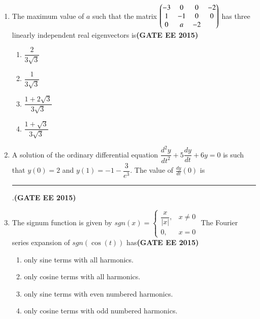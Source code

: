 \documentclass[a4paper,12pt]{exam}
\theoremstyle{remark}
\begin{document}
\begin{enumerate}
\begin{multicols}{4}
    \begin{enumerate}
        \item $\dfrac{G_1}{1 + G_2(1 + G_1)}$
        \item $\dfrac{G_2}{1 + G_1(1 + G_2)}$
        \item $\dfrac{G_1}{1 + G_1G_2}$
        \item $\dfrac{G_2}{1 + G_1G_2}$
    \end{enumerate}
\end{multicols}
\item The maximum value of $a$ such that the matrix
$
\begin{pmatrix}
-3 & 0 & 0 & -2 \\
1 & -1 & 0 & 0 \\
0 & a & -2
\end{pmatrix}
$
has three linearly independent real eigenvectors is\hfill{\textbf{(GATE EE 2015)}}
\begin{multicols}{4}
    \begin{enumerate}
        \item $\dfrac{2}{3\sqrt{3}}$
        \item $\dfrac{1}{3\sqrt{3}}$
        \item $\dfrac{1+2\sqrt{3}}{3\sqrt{3}}$
        \item $\dfrac{1+\sqrt{3}}{3\sqrt{3}}$
    \end{enumerate}
\end{multicols}
\item A solution of the ordinary differential equation $\dfrac{d^2y}{dt^2} + 5\dfrac{dy}{dt} + 6y = 0$ is such that $y(0) = 2$ and $y(1) = -1 - \dfrac{3}{e^3}$. The value of $\frac{dy}{dt}(0)$ is \rule{3cm}{0.15mm}.\hfill{\textbf{(GATE EE 2015)}}
\item The signum function is given by
$
sgn(x) =
\begin{cases}
\dfrac{x}{|x|}, & x \neq 0 \\
0, & x = 0
\end{cases}
$
The Fourier series expansion of $sgn(\cos(t))$ has\hfill{\textbf{(GATE EE 2015)}}
    \begin{enumerate}
        \item only sine terms with all harmonics.
        \item only cosine terms with all harmonics.
        \item only sine terms with even numbered harmonics.
        \item only cosine terms with odd numbered harmonics.
    \end{enumerate}


\end{enumerate}
\end{document}
